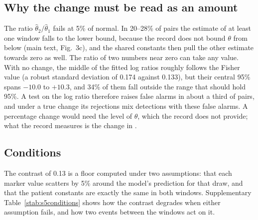 \subsection{Why the change must be read as an amount}
\label{si:s5:ratio}

The ratio $\hat\theta_2/\hat\theta_1$ fails at 5\% of normal. In 20--28\% of pairs the estimate
of at least one window falls to the lower bound, because the record does not bound $\theta$ from below
(main text, Fig.~3c), and the shared constants then pull the other estimate towards zero as well.
The ratio of two numbers near zero can take any value. With no change, the middle of the fitted
log ratios roughly follows the Fisher value (a robust standard deviation of 0.174 against 0.133),
but their central 95\% spans $-10.0$ to $+10.3$, and 34\% of them fall outside the range that
should hold 95\%. A test on the log ratio therefore raises false alarms in about a third of
pairs, and under a true change its rejections mix detections with these false alarms. A
percentage change would need the level of $\theta$, which the record does not provide; what the
record measures is the change in \um.

\subsection{Conditions}
\label{si:s5:conditions}

The contrast of 0.13 is a floor computed under two assumptions: that each marker value scatters
by 5\% around the model's prediction for that draw, and that the patient constants are exactly
the same in both windows. Supplementary Table~\ref{stab:s5conditions} shows how the contrast
degrades when either assumption fails, and how two events between the windows act on it.

